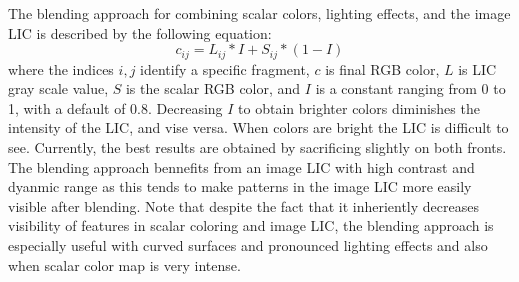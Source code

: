 \documentclass[a4paper,10pt]{article}
\begin{document}
The blending approach for combining scalar colors, lighting effects, and the image LIC is described by the following equation:
\begin{equation}
c_{ij} = L_{ij} * I + S_{ij} * (1 - I)
\label{eqn:color-blend}
\end{equation}
where the indices $i,j$ identify a specific fragment, $c$ is final RGB color, $L$ is LIC gray scale value, $S$ is the scalar RGB color, and $I$ is a constant ranging from 0 to 1, with a default of 0.8. Decreasing $I$ to obtain brighter colors diminishes the intensity of the LIC, and vise versa. When colors are bright the LIC is difficult to see. Currently, the best results are obtained by sacrificing slightly on both fronts. The blending approach bennefits from an image LIC with high contrast and dyanmic range as this tends to make patterns in the image LIC more easily visible after blending. Note that despite the fact that it inheriently decreases visibility of features in scalar coloring and image LIC, the blending approach is especially useful with curved surfaces and pronounced lighting effects and also when scalar color map is very intense.
\FloatBarrier
\end{document}
